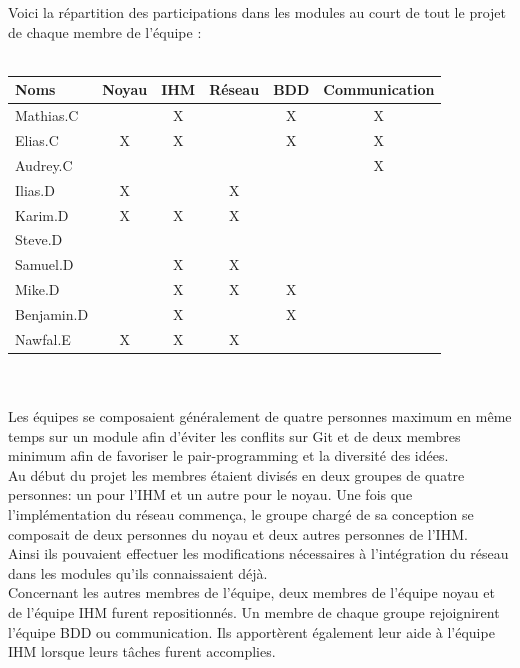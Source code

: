 \documentclass[a4paper,11pt]{article}
\begin{document}
\newpage

Voici la répartition des participations dans les modules au court de tout le projet de chaque membre de l’équipe : \\\\



\begin{tabular}{|l|c|c|c|c|c|}
  \hline
  Noms & Noyau & IHM & Réseau & BDD & Communication \\
  \hline
  Mathias.C &  & X &  & X & X \\
  \hline
  Elias.C & X & X &  & X & X \\
  \hline
  Audrey.C &  &  &  &  & X \\
  \hline
  Ilias.D & X &  & X &  &  \\
  \hline
  Karim.D & X & X & X &  &  \\
  \hline
  Steve.D &  &  &  &  &  \\
  \hline
  Samuel.D &  & X & X &  &  \\
  \hline
  Mike.D &  & X & X & X &  \\
  \hline
  Benjamin.D &  & X &  & X &  \\
  \hline
  Nawfal.E & X & X & X &  &  \\
  \hline
\end{tabular} \\\\


Les équipes se composaient généralement de quatre personnes maximum en même temps sur un module afin d’éviter les conflits sur Git et de deux membres minimum afin de favoriser le pair-programming et la diversité des idées.\\

Au début du projet les membres étaient divisés en deux groupes de quatre personnes: un pour l’IHM et un autre pour le noyau. Une fois que l’implémentation du réseau commença, le groupe chargé de sa conception se composait de deux personnes du noyau et deux autres personnes de l’IHM.\\

Ainsi ils pouvaient effectuer les modifications nécessaires à l’intégration du réseau dans les modules qu’ils connaissaient déjà. \\

Concernant les autres membres de l’équipe, deux membres de l’équipe noyau et de l’équipe IHM furent repositionnés. Un membre de chaque groupe rejoignirent l’équipe BDD ou communication. Ils apportèrent également leur aide à l’équipe IHM lorsque leurs tâches furent accomplies. \\
\end{document}
